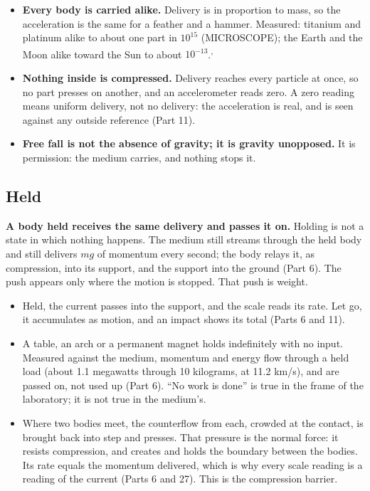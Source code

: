 \documentclass[11pt,a4paper]{article}
\begin{document}
\begin{itemize}
\item \textbf{Every body is carried alike.} Delivery is in proportion to mass, so the acceleration is the same for a feather and a hammer. Measured: titanium and platinum alike to about one part in $10^{15}$ (MICROSCOPE); the Earth and the Moon alike toward the Sun to about $10^{-13}$.\textsuperscript{,}
\item \textbf{Nothing inside is compressed.} Delivery reaches every particle at once, so no part presses on another, and an accelerometer reads zero. A zero reading means uniform delivery, not no delivery: the acceleration is real, and is seen against any outside reference (Part 11).
\item \textbf{Free fall is not the absence of gravity; it is gravity unopposed.} It is permission: the medium carries, and nothing stops it.
\end{itemize}

\subsection{Held}

\begin{hypbar}
\textbf{A body held receives the same delivery and passes it on.} Holding is not a state in which nothing happens. The medium still streams through the held body and still delivers $mg$ of momentum every second; the body relays it, as compression, into its support, and the support into the ground (Part 6).\footnotemark{} The push appears only where the motion is stopped. That push is weight.
\end{hypbar}

\begin{itemize}
\item {} Held, the current passes into the support, and the scale reads its rate. Let go, it accumulates as motion, and an impact shows its total (Parts 6 and 11).
\item {} A table, an arch or a permanent magnet holds indefinitely with no input. Measured against the medium, momentum and energy flow through a held load (about 1.1 megawatts through 10 kilograms, at 11.2 km/s), and are passed on, not used up (Part 6). ``No work is done'' is true in the frame of the laboratory; it is not true in the medium's.
\item {} Where two bodies meet, the counterflow from each, crowded at the contact, is brought back into step and presses. That pressure is the normal force: it resists compression, and creates and holds the boundary between the bodies. Its rate equals the momentum delivered, which is why every scale reading is a reading of the current (Parts 6 and 27). This is the compression barrier.
\end{itemize}
\end{document}
